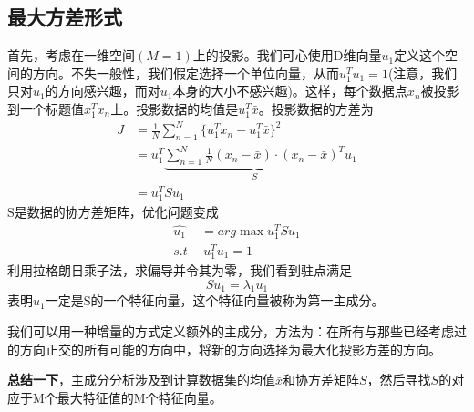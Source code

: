 \subsection*{最大方差形式}
首先，考虑在一维空间$(M=1)$上的投影。我们可心使用D维向量$u_1$定义这个空间的方向。不失一般性，我们假定选择一个单位向量，从而$u_1^Tu_1=1$(注意，我们只对$u_1$的方向感兴趣，而对$u_1$本身的大小不感兴趣)。这样，每个数据点$x_n$被投影到一个标题值$x_1^Tx_n$上。投影数据的均值是$u_1^T\bar{x}$。投影数据的方差为
\begin{equation}
\begin{aligned}
	J&=\frac{1}{N}\sum_{n=1}^{N}\{u_1^Tx_n-u_1^T\bar{x}\}^2\\
	&=u_1^T\underbrace{\sum_{n=1}^{N}\frac{1}{N}(x_n-\bar{x})\cdot(x_n-\bar{x})^T}_Su_1\\
	&=u_1^TSu_1
\end{aligned}	
\end{equation}
S是数据的协方差矩阵，优化问题变成
\begin{equation}
	\begin{aligned}
		\hat{u_1}&=arg \mathop{max} u_1^TSu_1\\
		s.t\ &\ u_1^Tu_1=1
	\end{aligned}
\end{equation}
利用拉格朗日乘子法，求偏导并令其为零，我们看到驻点满足
\begin{equation}
	Su_1=\lambda_1u_1
\end{equation}
表明$u_1$一定是S的一个特征向量，这个特征向量被称为第一主成分。

我们可以用一种增量的方式定义额外的主成分，方法为：在所有与那些已经考虑过的方向正交的所有可能的方向中，将新的方向选择为最大化投影方差的方向。

\textbf{总结一下}，主成分分析涉及到计算数据集的均值$\bar{x}$和协方差矩阵$S$，然后寻找$S$的对应于M个最大特征值的M个特征向量。
